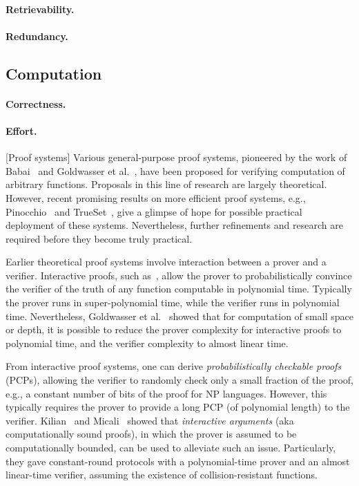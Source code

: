 \paragraph{Retrievability.}

\paragraph{Redundancy.}




\subsection{Computation}

\paragraph{Correctness.}

\paragraph{Effort.}

[Proof systems]
Various general-purpose proof systems, pioneered by the work of Babai~\cite{Bab85} and Goldwasser et al.~\cite{GMR89}, have been proposed for verifying computation of arbitrary functions.
Proposals in this line of research are largely theoretical.
However, recent promising results on more efficient proof systems, e.g., Pinocchio~\cite{PHG+13} and TrueSet~\cite{KPP+14}, give a glimpse of hope for possible practical deployment of these systems.
Nevertheless, further refinements and research are required before they become truly practical.

Earlier theoretical proof systems involve interaction between a prover and a verifier.
Interactive proofs, such as~\cite{LFK+92,Sha92}, allow the prover to probabilistically convince the verifier of the truth of any function computable in polynomial time.
Typically the prover runs in super-polynomial time, while the verifier runs in polynomial time.
Nevertheless, Goldwasser et al.~\cite{GKR08} showed that for computation of small space or depth, it is possible to reduce the prover complexity for interactive proofs to polynomial time, and the verifier complexity to almost linear time.  

From interactive proof systems, one can derive {\em probabilistically checkable proofs} (PCPs), allowing the verifier to randomly check only a small fraction of the proof, e.g., a constant number of bits of the proof for NP languages.
However, this typically requires the prover to provide a long PCP (of polynomial length) to the verifier.
Kilian~\cite{Kil92} and Micali~\cite{Mic94} showed that {\em interactive arguments} (aka computationally sound proofs), in which the prover is assumed to be computationally bounded, can be used to alleviate such an issue.
Particularly, they gave constant-round protocols with a polynomial-time prover and an almost linear-time verifier, assuming the existence of collision-resistant functions.

